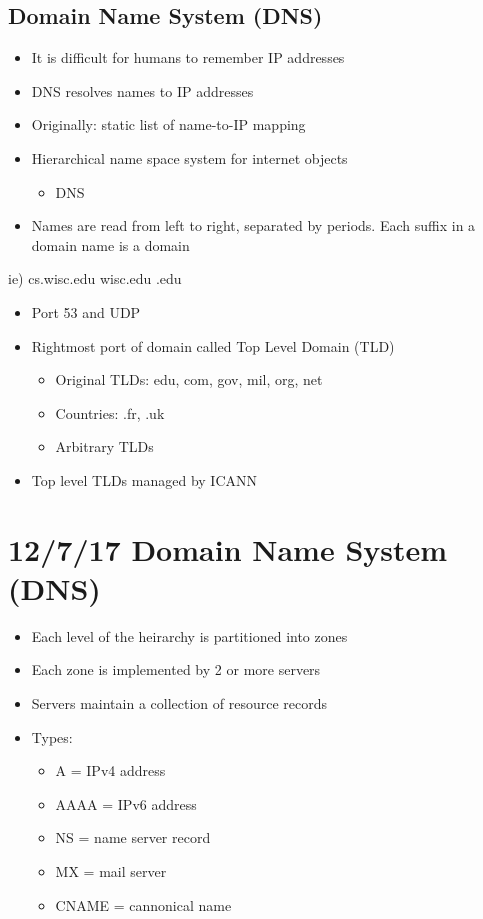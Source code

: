 \documentclass[11pt]{article}
\begin{document}
\subsection{Domain Name System (DNS)}
\label{sec:orgheadline152}
\begin{itemize}
\item It is difficult for humans to remember IP addresses
\item DNS resolves names to IP addresses
\item Originally: static list of name-to-IP mapping
\item Hierarchical name space system for internet objects
\begin{itemize}
\item DNS
\end{itemize}
\item Names are read from left to right, separated by periods. Each suffix
in a domain name is a domain
\end{itemize}
ie) cs.wisc.edu
wisc.edu
.edu
\begin{itemize}
\item Port 53 and UDP
\item Rightmost port of domain called Top Level Domain (TLD)
\begin{itemize}
\item Original TLDs: edu, com, gov, mil, org, net
\item Countries: .fr, .uk
\item Arbitrary TLDs
\end{itemize}
\item Top level TLDs managed by ICANN
\end{itemize}

\section{12/7/17 Domain Name System (DNS)}
\label{sec:orgheadline167}
\begin{itemize}
\item Each level of the heirarchy is partitioned into zones
\item Each zone is implemented by 2 or more servers
\item Servers maintain a collection of resource records
\item Types:
\begin{itemize}
\item A = IPv4 address
\item AAAA = IPv6 address
\item NS = name server record
\item MX = mail server
\item CNAME = cannonical name
\end{itemize}
\end{itemize}
\end{document}
